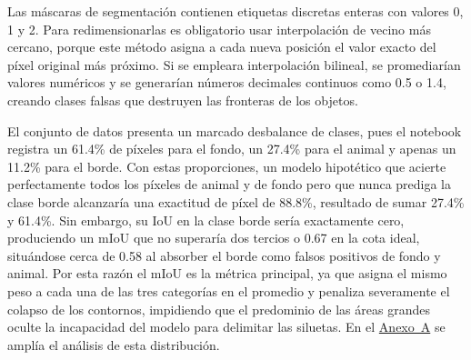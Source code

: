 \documentclass[10pt,letterpaper]{article}
\newcommand{\sangria}{\hspace*{1.5em}}
\newcommand{\refanexo}[2]{\hyperref[#1]{Anexo~#2}}
\begin{document}
\sangria Las máscaras de segmentación contienen etiquetas discretas enteras con valores 0, 1 y 2. Para redimensionarlas es obligatorio usar interpolación de vecino más cercano, porque este método asigna a cada nueva posición el valor exacto del píxel original más próximo. Si se empleara interpolación bilineal, se promediarían valores numéricos y se generarían números decimales continuos como 0.5 o 1.4, creando clases falsas que destruyen las fronteras de los objetos.

El conjunto de datos presenta un marcado desbalance de clases, pues el notebook registra un 61.4\% de píxeles para el fondo, un 27.4\% para el animal y apenas un 11.2\% para el borde. Con estas proporciones, un modelo hipotético que acierte perfectamente todos los píxeles de animal y de fondo pero que nunca prediga la clase borde alcanzaría una exactitud de píxel de 88.8\%, resultado de sumar 27.4\% y 61.4\%. Sin embargo, su IoU en la clase borde sería exactamente cero, produciendo un mIoU que no superaría dos tercios o 0.67 en la cota ideal, situándose cerca de 0.58 al absorber el borde como falsos positivos de fondo y animal. Por esta razón el mIoU es la métrica principal, ya que asigna el mismo peso a cada una de las tres categorías en el promedio y penaliza severamente el colapso de los contornos, impidiendo que el predominio de las áreas grandes oculte la incapacidad del modelo para delimitar las siluetas. En el \refanexo{anexo_a}{A} se amplía el análisis de esta distribución.
\end{document}
